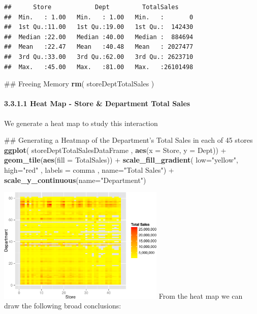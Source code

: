 \documentclass[]{article}
\newenvironment{Shaded}{\begin{snugshade}}{\end{snugshade}}
\newcommand{\KeywordTok}[1]{\textcolor[rgb]{0.13,0.29,0.53}{\textbf{{#1}}}}
\newcommand{\DataTypeTok}[1]{\textcolor[rgb]{0.13,0.29,0.53}{{#1}}}
\newcommand{\StringTok}[1]{\textcolor[rgb]{0.31,0.60,0.02}{{#1}}}
\newcommand{\NormalTok}[1]{{#1}}
\begin{document}
\begin{verbatim}
##      Store            Dept         TotalSales      
##  Min.   : 1.00   Min.   : 1.00   Min.   :       0  
##  1st Qu.:11.00   1st Qu.:19.00   1st Qu.:  142430  
##  Median :22.00   Median :40.00   Median :  884694  
##  Mean   :22.47   Mean   :40.48   Mean   : 2027477  
##  3rd Qu.:33.00   3rd Qu.:62.00   3rd Qu.: 2623710  
##  Max.   :45.00   Max.   :81.00   Max.   :26101498
\end{verbatim}

\begin{Shaded}
\begin{Highlighting}[]
\NormalTok{## Freeing Memory}
\KeywordTok{rm}\NormalTok{( storeDeptTotalSales )}
\end{Highlighting}
\end{Shaded}

\paragraph{3.3.1.1 Heat Map - Store \& Department Total
Sales}\label{heat-map---store-department-total-sales}

We generate a heat map to study this interaction

\begin{Shaded}
\begin{Highlighting}[]
\NormalTok{## Generating a Heatmap of the Department's Total Sales in each of 45 stores}
\KeywordTok{ggplot}\NormalTok{( storeDeptTotalSalesDataFrame , }\KeywordTok{aes}\NormalTok{(}\DataTypeTok{x =} \NormalTok{Store, }\DataTypeTok{y =} \NormalTok{Dept)) +}\StringTok{ }
\StringTok{  }\KeywordTok{geom_tile}\NormalTok{(}\KeywordTok{aes}\NormalTok{(}\DataTypeTok{fill =} \NormalTok{TotalSales)) +}
\StringTok{  }\KeywordTok{scale_fill_gradient}\NormalTok{(}
    \DataTypeTok{low=}\StringTok{"yellow"}\NormalTok{, }\DataTypeTok{high=}\StringTok{"red"} \NormalTok{, }\DataTypeTok{labels =} \NormalTok{comma , }\DataTypeTok{name=}\StringTok{"Total Sales"}\NormalTok{) +}
\StringTok{  }\KeywordTok{scale_y_continuous}\NormalTok{(}\DataTypeTok{name=}\StringTok{"Department"}\NormalTok{)}
\end{Highlighting}
\end{Shaded}

\includegraphics[width=300px]{PredictingWeeklySalesAtWalmart_files/figure-latex/heatmapStoreDept-1}
From the heat map we can draw the following broad conclusions:
\end{document}
